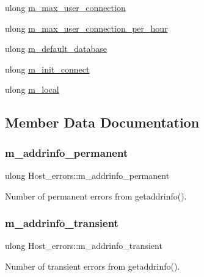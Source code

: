 \begin{DoxyCompactItemize}
\item 
ulong \mbox{\hyperlink{structHost__errors_ab756c9b30c8d6a51b9f8f5682c8315fe}{m\+\_\+max\+\_\+user\+\_\+connection}}
\item 
ulong \mbox{\hyperlink{structHost__errors_a53c25c91915e5767bfb788095274b81e}{m\+\_\+max\+\_\+user\+\_\+connection\+\_\+per\+\_\+hour}}
\item 
ulong \mbox{\hyperlink{structHost__errors_a5deb0e1fdf48e33d1371b041bc9d4211}{m\+\_\+default\+\_\+database}}
\item 
ulong \mbox{\hyperlink{structHost__errors_a85446dc67a0c66ec41d4f2810eb4c1d2}{m\+\_\+init\+\_\+connect}}
\item 
ulong \mbox{\hyperlink{structHost__errors_ad7223c649f69f7696fa0b42dea379f9f}{m\+\_\+local}}
\end{DoxyCompactItemize}


\subsection{Member Data Documentation}
\mbox{\label{structHost__errors_adbf5d7d2d96265a5e858210bb225172f}} 
\subsubsection{\texorpdfstring{m\+\_\+addrinfo\+\_\+permanent}{m\_addrinfo\_permanent}}
{\footnotesize\ttfamily ulong Host\+\_\+errors\+::m\+\_\+addrinfo\+\_\+permanent}

Number of permanent errors from getaddrinfo(). \mbox{\label{structHost__errors_ae7a68b73f7cc9228e3415478a5b8bb04}} 
\subsubsection{\texorpdfstring{m\+\_\+addrinfo\+\_\+transient}{m\_addrinfo\_transient}}
{\footnotesize\ttfamily ulong Host\+\_\+errors\+::m\+\_\+addrinfo\+\_\+transient}

Number of transient errors from getaddrinfo(). \mbox{\label{structHost__errors_af4890a1d4a69c4b2082e892e79383516}} 
